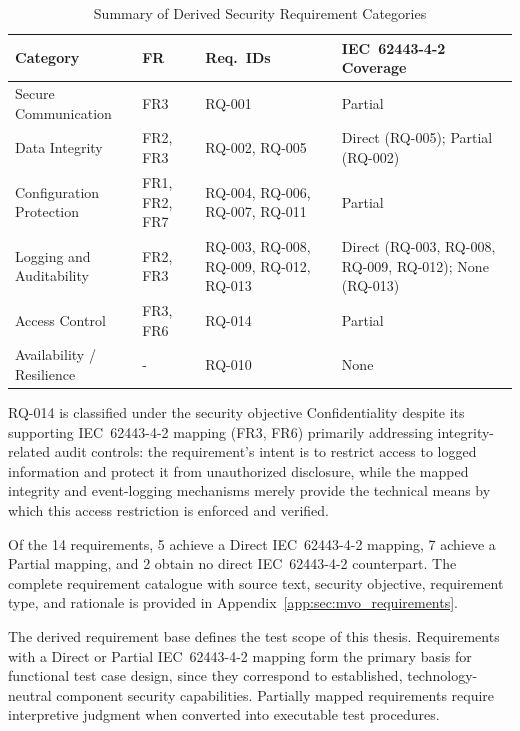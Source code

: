 \renewcommand{\arraystretch}{1.2}
\begin{table}[htbp]
	\caption{Summary of Derived Security Requirement Categories}
	\label{tab:req_categories}
	\centering
	\begin{tabularx}{\textwidth}{|l | X | X | X|}
		\toprule
		\textbf{Category} & \textbf{FR} & \textbf{Req.\ IDs} & \textbf{IEC~62443-4-2 Coverage} \\
		\midrule
		Secure Communication        & FR3              & RQ-001                                   & Partial \\
		Data Integrity              & FR2, FR3         & RQ-002, RQ-005                           & Direct (RQ-005); Partial (RQ-002) \\
		Configuration Protection    & FR1, FR2, FR7    & RQ-004, RQ-006, RQ-007, RQ-011           & Partial \\
		Logging and Auditability    & FR2, FR3         & RQ-003, RQ-008, RQ-009, RQ-012, RQ-013  & Direct (RQ-003, RQ-008, RQ-009, RQ-012); None (RQ-013) \\
		Access Control              & FR3, FR6         & RQ-014                                   & Partial \\
		Availability / Resilience   & -              & RQ-010                                   & None \\
		\bottomrule
	\end{tabularx}
\end{table}

RQ-014 is classified under the security objective Confidentiality despite its supporting IEC~62443-4-2 mapping (FR3, FR6) primarily addressing integrity-related audit controls: the requirement's intent is to restrict access to logged information and protect it from unauthorized disclosure, while the mapped integrity and event-logging mechanisms merely provide the technical means by which this access restriction is enforced and verified.

Of the 14 requirements, 5 achieve a Direct IEC~62443-4-2 mapping, 7 achieve a Partial mapping, and 2 obtain no direct IEC~62443-4-2 counterpart. The complete requirement catalogue with source text, security objective, requirement type, and rationale is provided in Appendix~\ref{app:sec:mvo_requirements}.


The derived requirement base defines the test scope of this thesis. Requirements with a Direct or Partial IEC~62443-4-2 mapping form the primary basis for functional test case design, since they correspond to established, technology-neutral component security capabilities. Partially mapped requirements require interpretive judgment when converted into executable test procedures.

